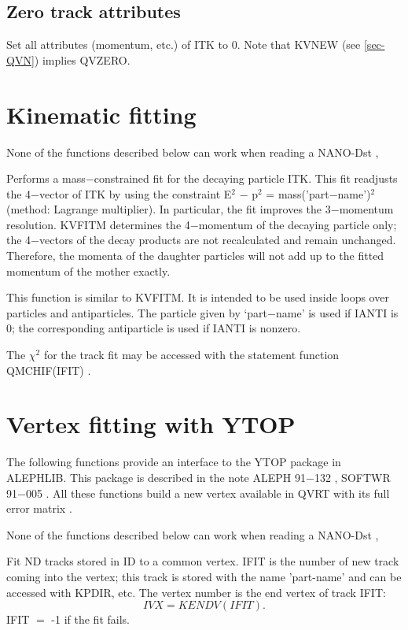 \subsection{\label{sec-QVZ}Zero track attributes}
\par
{}
\par
\par
Set all attributes (momentum, etc.) of ITK to 0. Note that KVNEW
(see \ref{sec-QVN}) implies QVZERO.
\par
\section{\label{sec-QFIT}Kinematic fitting}
\par
 None of the functions described below can work when reading a NANO-Dst ,
\par
{}
\par
Performs a mass$-$constrained fit for the decaying particle ITK.
This fit readjusts the 4$-$vector of ITK by using the constraint
E$^2$ $-$ p$^2$ = mass('part$-$name')$^2$  (method: Lagrange multiplier).
In particular, the fit improves the 3$-$momentum resolution.
KVFITM determines the 4$-$momentum of the decaying particle only;
the
4$-$vectors of the decay products are not recalculated and remain
unchanged.  Therefore, the momenta of the daughter particles will
not
add up to the fitted momentum of the mother exactly.
\par
\noindent{}
\par
This function is similar to KVFITM. It is intended to be
used inside loops over particles and
antiparticles.  The particle given by `part$-$name' is used if
IANTI is 0; the corresponding antiparticle is used if IANTI is
nonzero.
\par
 
The $\chi^2$ for the track fit may be accessed with the statement
function QMCHIF(IFIT) .
\par
\section{\label{sec-QVFIT}Vertex fitting with YTOP}
\par
The following functions provide an interface to the YTOP package
in ALEPHLIB. This package is described in the note ALEPH 91$-$132 , SOFTWR 91$-$005  .
All these functions build a new vertex available in QVRT with its full error matrix .
\par
 None of the functions described below can work when reading a NANO-Dst ,
\par
\noindent{}
\par
\noindent Fit ND tracks stored in ID to a common vertex.
IFIT is the number of new track coming into the vertex; this track is stored
with the name 'part-name' and can be accessed with KPDIR, etc.
The vertex number is the end vertex of track IFIT:
$$IVX = KENDV(IFIT).$$
IFIT $=$ -1 if the fit fails.
 
